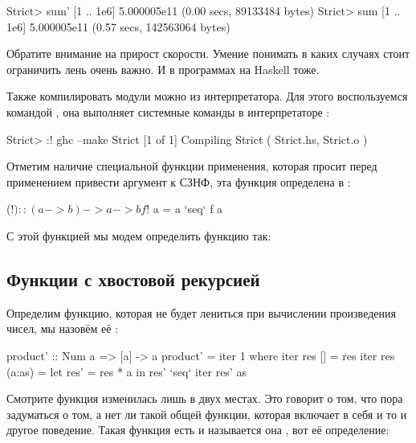 \begin{code}
Strict> sum' [1 .. 1e6]
5.000005e11
(0.00 secs, 89133484 bytes)
Strict> sum [1 .. 1e6]
5.000005e11
(0.57 secs, 142563064 bytes)
\end{code}

Обратите внимание на прирост скорости. Умение понимать
в каких случаях стоит ограничить лень очень важно. 
И в программах на Haskell тоже. 

Также компилировать модули можно из интерпретатора.
Для этого воспользуемся командой \In{:!}, она 
выполняет системные команды в интерпретаторе :

\begin{code}
Strict> :! ghc --make Strict
[1 of 1] Compiling Strict           ( Strict.hs, Strict.o )
\end{code}

Отметим наличие специальной функции применения, которая
просит перед применением привести аргумент к СЗНФ, эта 
функция определена в :

\begin{code}
($!) :: (a -> b) -> a -> b
 f $! a = a `seq` f a
\end{code}

С этой функцией мы модем определить функцию  так:



\subsection{Функции с хвостовой рекурсией}

Определим функцию, которая не будет лениться при
вычислении произведения чисел, мы назовём её :

\begin{code}
product' :: Num a => [a] -> a
product' = iter 1
    where iter res []        = res
          iter res (a:as)    = let res' = res * a
                               in  res' `seq` iter res' as 
\end{code}

Смотрите функция  изменилась лишь в двух местах. Это
говорит о том, что пора задуматься о том, а нет ли такой
общей функции, которая включает в себя и то и другое поведение.
Такая функция есть и называется она , вот её определение:

